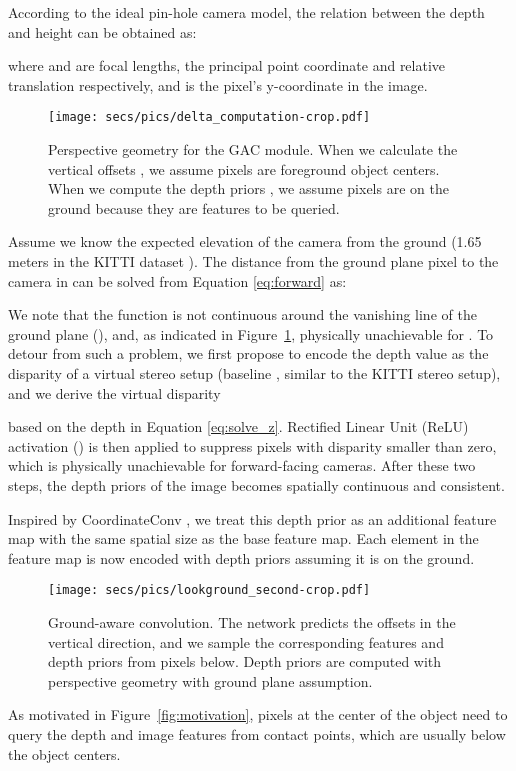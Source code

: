 \documentclass[letterpaper, 10 pt, journal, twoside]{IEEEtran}
\begin{document}
According to the ideal pin-hole camera model, the relation between the depth  and height  can be obtained as:

where  and  are focal lengths, the principal point coordinate and relative translation respectively, and  is the pixel's y-coordinate in the image. 
\begin{figure}
    \centering
    \texttt{[image: secs/pics/delta\_computation-crop.pdf]}
    \caption{Perspective geometry for the GAC module. When we calculate the vertical offsets , we assume pixels are foreground object centers. When we compute the depth priors , we assume pixels are on the ground because they are features to be queried. }
    \label{fig:geometric}
  \end{figure} 
 Assume we know the expected elevation  of the camera from the ground (1.65 meters in the KITTI dataset \cite{Geiger2012KITTI}). The distance from the ground plane pixel to the camera in  can be solved from Equation \ref{eq:forward}
 as:


We note that the function is not continuous around the vanishing line of the ground plane (), and, as indicated in Figure~\ref{fig:geometric}, physically unachievable for . To detour from such a problem, we first propose to encode the depth value as the disparity of a virtual stereo setup (baseline , similar to the KITTI stereo setup), and we derive the virtual disparity

based on the depth  in Equation \ref{eq:solve_z}. Rectified Linear Unit (ReLU) activation () is then applied to suppress pixels with disparity smaller than zero, which is physically unachievable for forward-facing cameras. After these two steps, the depth priors of the image becomes spatially continuous and consistent.

Inspired by CoordinateConv \cite{Liu2018CoordConv}, we treat this depth prior as an additional feature map with the same spatial size as the base feature map. Each element in the feature map is now encoded with depth priors assuming it is on the ground.

\begin{figure}
    \centering
        \texttt{[image: secs/pics/lookground\_second-crop.pdf]}

    \caption{Ground-aware convolution. The network predicts the offsets in the vertical direction, and we sample the corresponding features and depth priors from pixels below. Depth priors are computed with perspective geometry with ground plane assumption.
    }
    \label{fig:LOOKGROUND}

\end{figure} As motivated in Figure~\ref{fig:motivation}, pixels at the center of the object need to query the depth and image features from contact points, which are usually below the object centers.
\end{document}
